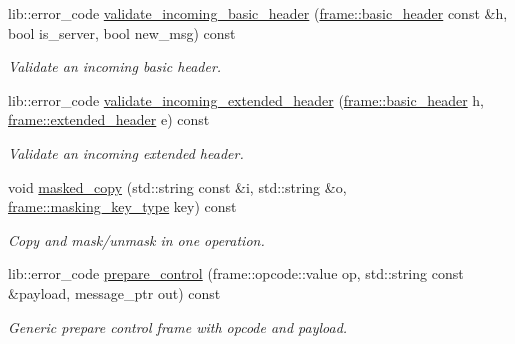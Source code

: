 \begin{DoxyCompactItemize}
lib\+::error\+\_\+code \mbox{\hyperlink{classwebsocketpp_1_1processor_1_1hybi13_a0c549a5e2766288fb625c03e507cc9ad}{validate\+\_\+incoming\+\_\+basic\+\_\+header}} (\mbox{\hyperlink{structwebsocketpp_1_1frame_1_1basic__header}{frame\+::basic\+\_\+header}} const \&h, bool is\+\_\+server, bool new\+\_\+msg) const
\begin{DoxyCompactList}\small\item\em Validate an incoming basic header. \end{DoxyCompactList}\item 
lib\+::error\+\_\+code \mbox{\hyperlink{classwebsocketpp_1_1processor_1_1hybi13_aee8565136bb0820e9a8914dfc5fdb753}{validate\+\_\+incoming\+\_\+extended\+\_\+header}} (\mbox{\hyperlink{structwebsocketpp_1_1frame_1_1basic__header}{frame\+::basic\+\_\+header}} h, \mbox{\hyperlink{structwebsocketpp_1_1frame_1_1extended__header}{frame\+::extended\+\_\+header}} e) const
\begin{DoxyCompactList}\small\item\em Validate an incoming extended header. \end{DoxyCompactList}\item 
void \mbox{\hyperlink{classwebsocketpp_1_1processor_1_1hybi13_a888318b2773af49d458313a96a817a7a}{masked\+\_\+copy}} (std\+::string const \&i, std\+::string \&o, \mbox{\hyperlink{unionwebsocketpp_1_1frame_1_1uint32__converter}{frame\+::masking\+\_\+key\+\_\+type}} key) const
\begin{DoxyCompactList}\small\item\em Copy and mask/unmask in one operation. \end{DoxyCompactList}\item 
lib\+::error\+\_\+code \mbox{\hyperlink{classwebsocketpp_1_1processor_1_1hybi13_a5aa8f27959beeeef73997a80c2560663}{prepare\+\_\+control}} (frame\+::opcode\+::value op, std\+::string const \&payload, message\+\_\+ptr out) const
\begin{DoxyCompactList}\small\item\em Generic prepare control frame with opcode and payload. \end{DoxyCompactList}\end{DoxyCompactItemize}
